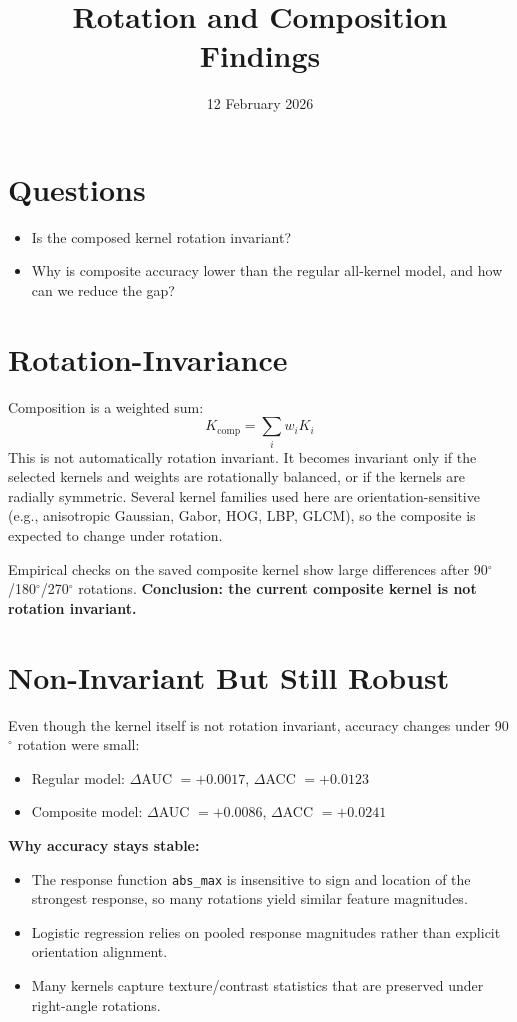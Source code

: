 \documentclass{article}
\begin{document}
\title{Rotation and Composition Findings}
\author{}
\date{12 February 2026}
\maketitle

\section*{Questions}
\begin{itemize}
    \item Is the composed kernel rotation invariant?
    \item Why is composite accuracy lower than the regular all-kernel model, and how can we reduce the gap?
\end{itemize}

\section*{Rotation-Invariance}
Composition is a weighted sum:
\[
K_{\text{comp}} = \sum_i w_i K_i
\]
This is not automatically rotation invariant. It becomes invariant only if the selected kernels and weights are rotationally balanced, or if the kernels are radially symmetric. Several kernel families used here are orientation-sensitive (e.g., anisotropic Gaussian, Gabor, HOG, LBP, GLCM), so the composite is expected to change under rotation.

Empirical checks on the saved composite kernel show large differences after 90$^\circ$/180$^\circ$/270$^\circ$ rotations. \textbf{Conclusion: the current composite kernel is not rotation invariant.}

\section*{Non-Invariant But Still Robust}
Even though the kernel itself is not rotation invariant, accuracy changes under 90$^\circ$ rotation were small:
\begin{itemize}
    \item Regular model: $\Delta$AUC $= +0.0017$, $\Delta$ACC $= +0.0123$
    \item Composite model: $\Delta$AUC $= +0.0086$, $\Delta$ACC $= +0.0241$
\end{itemize}

\textbf{Why accuracy stays stable:}
\begin{itemize}
    \item The response function \texttt{abs\_max} is insensitive to sign and location of the strongest response, so many rotations yield similar feature magnitudes.
    \item Logistic regression relies on pooled response magnitudes rather than explicit orientation alignment.
    \item Many kernels capture texture/contrast statistics that are preserved under right-angle rotations.
\end{itemize}
\end{document}

